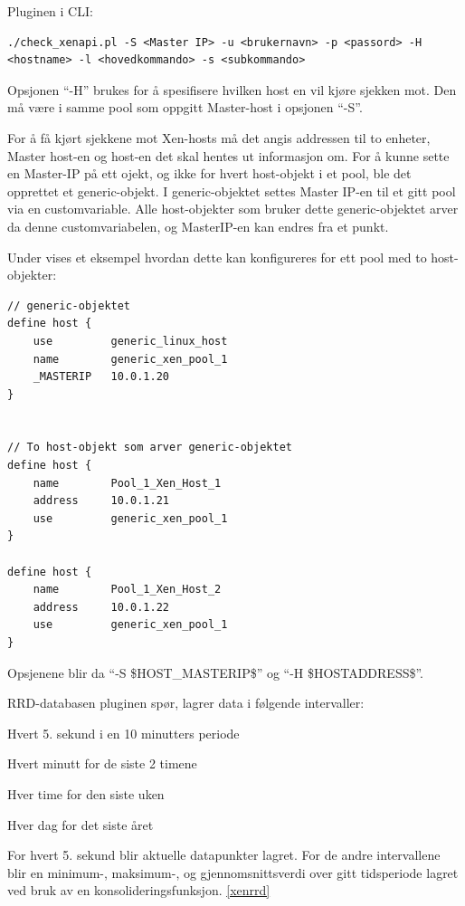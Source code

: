 Pluginen i CLI:
\begin{lstlisting}[style=example]
./check_xenapi.pl -S <Master IP> -u <brukernavn> -p <passord> -H <hostname> -l <hovedkommando> -s <subkommando>
\end{lstlisting}

Opsjonen ``-H'' brukes for å spesifisere hvilken host en vil kjøre sjekken mot. Den må være i samme pool som oppgitt Master-host i opsjonen ``-S''.

For å få kjørt sjekkene mot Xen-hosts må det angis addressen til to enheter, Master host-en og host-en det skal hentes ut informasjon om. For å kunne sette en Master-IP på ett ojekt, og ikke for hvert host-objekt i et pool, ble det opprettet et generic-objekt. I generic-objektet settes Master IP-en til et gitt pool via en customvariable. Alle host-objekter som bruker dette generic-objektet arver da denne customvariabelen, og MasterIP-en kan endres fra et punkt.

Under vises et eksempel hvordan dette kan konfigureres for ett pool med to host-objekter:
\begin{lstlisting}[style=example]
// generic-objektet
define host {
    use 		generic_linux_host
    name 		generic_xen_pool_1
    _MASTERIP 	10.0.1.20
}


// To host-objekt som arver generic-objektet
define host {
    name 		Pool_1_Xen_Host_1
    address 	10.0.1.21
    use 		generic_xen_pool_1
}

define host {
    name 		Pool_1_Xen_Host_2
    address 	10.0.1.22
    use 		generic_xen_pool_1
}
\end{lstlisting}

Opsjenene blir da ``-S \$HOST\_MASTERIP\$'' og ``-H \$HOSTADDRESS\$''.

RRD-databasen pluginen spør, lagrer data i følgende intervaller:

\begin{enumerate*}
        \item Hvert 5. sekund i en 10 minutters periode
        \item Hvert minutt for de siste 2 timene
	\item Hver time for den siste uken
        \item Hver dag for det siste året
\end{enumerate*}

For hvert 5. sekund blir aktuelle datapunkter lagret. For de andre intervallene blir en minimum-, maksimum-, og gjennomsnittsverdi over gitt tidsperiode lagret ved bruk av en konsolideringsfunksjon. \ref{xenrrd}

